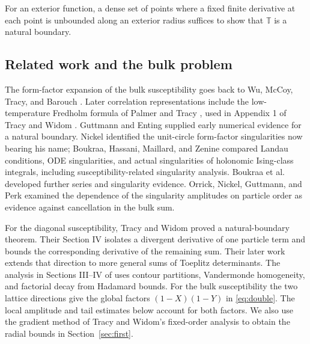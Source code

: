 \documentclass[11pt]{article}
\numberwithin{equation}{section}
\theoremstyle{definition}
\newcommand{\T}{\mathbb T}
\begin{document}
For an exterior function, a dense set of points where a fixed finite
derivative at each point is unbounded along an exterior radius suffices
to show that \(\T\) is a natural boundary.

\subsection{Related work and the bulk problem}
The form-factor expansion of the bulk susceptibility goes back to
Wu, McCoy, Tracy, and Barouch \cite{WMTB1976}. Later correlation
representations include the low-temperature Fredholm formula of
Palmer and Tracy \cite{PalmerTracy1981}, used in Appendix 1 of
Tracy and Widom \cite{TW2014}. Guttmann and Enting
\cite{GuttmannEnting1996} supplied early numerical evidence for a
natural boundary. Nickel \cite{Nickel1999,Nickel2000} identified
the unit-circle form-factor singularities now bearing his name;
Boukraa, Hassani, Maillard, and Zenine \cite{Boukraa2007}
compared Landau conditions, ODE singularities, and actual singularities
of holonomic Ising-class integrals, including susceptibility-related
singularity analysis. Boukraa et al.\ \cite{Boukraa2008} developed
further series and singularity evidence. Orrick, Nickel, Guttmann,
and Perk \cite[Section~3.2]{Orrick2001} examined the dependence of the
singularity amplitudes on particle order as evidence against
cancellation in the bulk sum.

For the diagonal susceptibility, Tracy and Widom \cite{TW2013}
proved a natural-boundary theorem. Their Section IV isolates a
divergent derivative of one particle term and bounds the corresponding
derivative of the remaining sum. Their later work
\cite{TW2017Toeplitz} extends that direction to more general sums
of Toeplitz determinants. The analysis in Sections III--IV of
\cite{TW2017Toeplitz} uses contour partitions, Vandermonde homogeneity,
and factorial decay from Hadamard bounds. For the bulk susceptibility
the two lattice directions give the global factors \((1-X)(1-Y)\)
in \eqref{eq:double}. The local amplitude and tail estimates below
account for both factors. We also use the gradient method of Tracy
and Widom's fixed-order analysis \cite{TW2014} to obtain the radial
bounds in Section~\ref{sec:first}.
\end{document}
